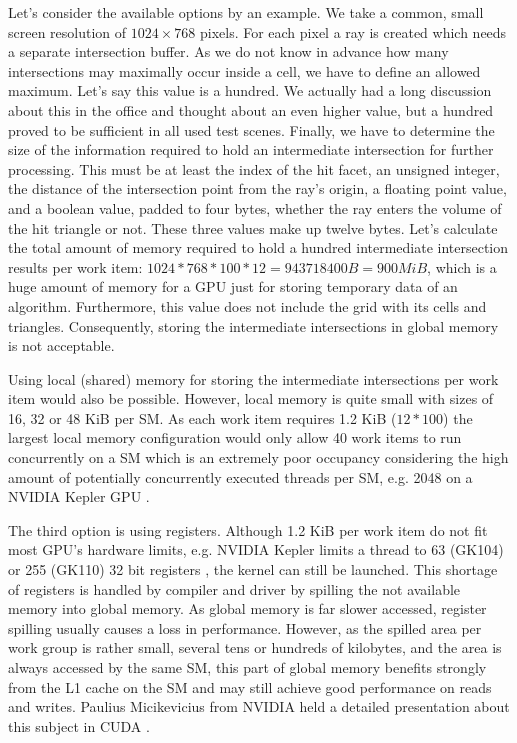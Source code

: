 Let's consider the available options by an example. We take a common, small screen resolution of $1024 \times 768$ pixels. For each pixel a ray is created which needs a separate intersection buffer. As we do not know in advance how many intersections may maximally occur inside a cell, we have to define an allowed maximum. Let's say this value is a hundred. We actually had a long discussion about this in the office and thought about an even higher value, but a hundred proved to be sufficient in all used test scenes. Finally, we have to determine the size of the information required to hold an intermediate intersection for further processing. This must be at least the index of the hit facet, an unsigned integer, the distance of the intersection point from the ray's origin, a floating point value, and a boolean value, padded to four bytes, whether the ray enters the volume of the hit triangle or not. These three values make up twelve bytes. Let's calculate the total amount of memory required to hold a hundred intermediate intersection results per work item: $1024 * 768 * 100 * 12 = 943718400 B = 900 MiB$, which is a huge amount of memory for a GPU just for storing temporary data of an algorithm. Furthermore, this value does not include the grid with its cells and triangles. Consequently, storing the intermediate intersections in global memory is not acceptable.

Using local (shared) memory for storing the intermediate intersections per work item would also be possible. However, local memory is quite small with sizes of 16, 32 or 48 KiB per SM. As each work item requires 1.2 KiB ($12 * 100$) the largest local memory configuration would only allow 40 work items to run concurrently on a SM which is an extremely poor occupancy considering the high amount of potentially concurrently executed threads per SM, e.g. 2048 on a NVIDIA Kepler GPU \cite[p.7]{kepler_arch}.

The third option is using registers. Although 1.2 KiB per work item do not fit most GPU's hardware limits, e.g. NVIDIA Kepler limits a thread to 63 (GK104) or 255 (GK110) 32 bit registers \cite{kepler_arch}, the kernel can still be launched. This shortage of registers is handled by compiler and driver by spilling the not available memory into global memory. As global memory is far slower accessed, register spilling usually causes a loss in performance. However, as the spilled area per work group is rather small, several tens or hundreds of kilobytes, and the area is always accessed by the same SM, this part of global memory benefits strongly from the L1 cache on the SM and may still achieve good performance on reads and writes. Paulius Micikevicius from NVIDIA held a detailed presentation about this subject in CUDA \cite{register_spilling}.

